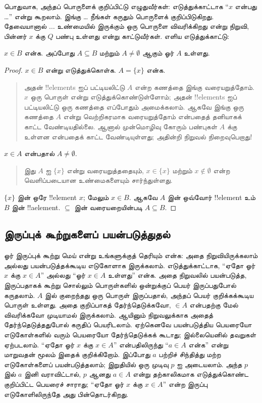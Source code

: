 \documentclass[../../../include/open-logic-section]{subfiles}
\begin{document}
பொதுவாக, அந்தப் பொருளைக் குறிப்பிட்டு எழுதுவீர்கள்:
எடுத்துக்காட்டாக ``$x$ என்பது \dots'' என்று கூறலாம்.
இங்கு \dots{} நீங்கள் கருதும் பொருளைக் குறிப்பிடுகிறது.
தேவையானால் $\dots$ உண்மையில் இருக்கும் ஒரு பொருளை
விவரிக்கிறது என்று நிறுவி, பின்னர் $x$ க்கு $Q$
பண்பு உள்ளது என்று காட்டுவீர்கள். எளிய எடுத்துக்காட்டு:

\begin{prop}
  $x \in B$ என்க. அப்போது $A \subseteq B$ மற்றும்
  $A \neq \emptyset$ ஆகும் ஓர் $A$ உள்ளது.
\end{prop}

\begin{proof}
  $x \in B$ என்று எடுத்துக்கொள்க. $A = \{x\}$ என்க.
  \begin{quote}
    அதன் !!{element}s ஐப் பட்டியலிட்டு $A$ என்ற
    கணத்தை இங்கு வரையறுத்தோம். $x$ ஒரு பொருள் என்று
    எடுத்துக்கொண்டுள்ளோம்; அதன் !!{element}s ஐப்
    பட்டியலிட்டு ஒரு கணத்தை எப்போதும் அமைக்கலாம்.
    ஆகவே இங்கு ஒரு கணத்தை $A$ என்று வெற்றிகரமாக
    வரையறுத்தோம் என்பதைத் தனியாகக் காட்ட வேண்டியதில்லை.
    ஆனால் முன்மொழிவு கோரும் பண்புகள் $A$ க்கு உள்ளன
    என்பதைக் காட்ட வேண்டியுள்ளது; அதின்றி நிறுவல்
    நிறைவுபெறாது!{}
  \end{quote}
  $x \in A$ என்பதால் $A \neq \emptyset$.
  \begin{quote}
    இது $A$ ஐ $\{x\}$ என்று வரையறுத்ததையும்,
    $x \in \{x\}$ மற்றும் $x \notin \emptyset$
    என்ற வெளிப்படையான உண்மைகளையும் சார்ந்துள்ளது.
  \end{quote}
  $\{x\}$ இன் ஒரே !!{element} $x$; மேலும்
  $x \in B$. ஆகவே $A$ இன் ஒவ்வோர் !!{element}
  உம் $B$ இன் !!a{element}. $\subseteq$ இன்
  வரையறையின்படி $A \subseteq B$.
\end{proof}

\subsection{இருப்புக் கூற்றுகளைப் பயன்படுத்துதல்}

ஓர் இருப்புக் கூற்று மெய் என்று உங்களுக்குத் தெரியும் என்க:
அதை நிறுவியிருக்கலாம் அல்லது பயன்படுத்தக்கூடிய எடுகோளாக
இருக்கலாம். எடுத்துக்காட்டாக, ``ஏதோ ஓர் $x$ க்கு
$x \in A$'' அல்லது ``ஓர் $x \in A$ உள்ளது''
என்க. அதை நிறுவலில் பயன்படுத்த, இருப்பதாகக் கூற்று
சொல்லும் பொருள்களில் ஒன்றுக்குப் பெயர் இருப்பதுபோல்
கருதலாம். $A$ இல் குறைந்தது ஒரு பொருள் இருப்பதால்,
அந்தப் பெயர் குறிக்கக்கூடிய பொருள் உள்ளது. அதை
குறிப்பாகத் தேர்ந்தெடுக்கவோ, $\in A$ என்பதற்கு மேல்
விவரிக்கவோ முடியாமல் இருக்கலாம். ஆயினும் நிறுவலுக்காக
அதைத் தேர்ந்தெடுத்ததுபோல் கருதிப் பெயரிடலாம்.
ஏற்கெனவே பயன்படுத்திய பெயரையோ எடுகோள்களில் வரும்
பெயரையோ தேர்ந்தெடுக்கக் கூடாது; இல்லையெனில்
தவறுகள் ஏற்படலாம். ``ஏதோ ஓர் $x$ க்கு $x \in A$''
என்பதிலிருந்து ``$a \in A$ என்க'' என்று மாறுவதன்
மூலம் இதைக் குறிக்கிறோம். இப்போது $a$ பற்றிச்
சிந்தித்து மற்ற எடுகோள்களைப் பயன்படுத்தலாம்; இறுதியில்
ஒரு முடிவு $p$ ஐ அடையலாம். அந்த $p$ இல் $a$
இனி வராவிட்டால், $p$ ஆனது $a \in A$ என்று
தற்காலிகமாக எடுத்துக்கொண்ட குறிப்பிட்ட பெயரைச் சாராது;
``ஏதோ ஓர் $x$ க்கு $x \in A$'' என்ற இருப்பு
எடுகோளிலிருந்தே அது பின்தொடர்கிறது.
\end{document}
